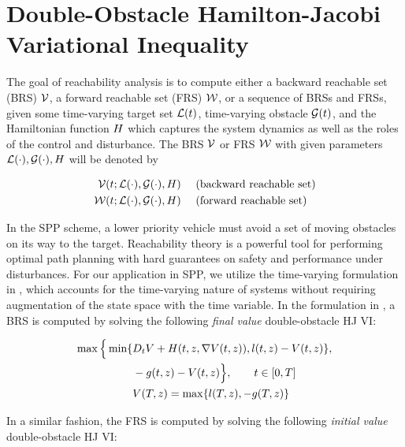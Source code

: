 \section{Double-Obstacle Hamilton-Jacobi Variational Inequality \label{sec:HJIVI}}
The goal of reachability analysis is to compute either a backward reachable set (BRS) $\mathcal{V}$, a forward reachable set (FRS) $\mathcal{W}$, or a sequence of BRSs and FRSs, given some time-varying target set $\mathcal{L}(t)$, time-varying obstacle $\mathcal{G}(t)$, and the Hamiltonian function $H$ which captures the system dynamics as well as the roles of the control and disturbance. The BRS $\mathcal{V}$ or FRS $\mathcal{W}$ with given parameters $\mathcal{L}(\cdot), \mathcal{G}(\cdot), H$ will be denoted by

\begin{equation}
\begin{aligned}
\mathcal{V}(t; \mathcal{L}(\cdot), \mathcal{G}(\cdot), H) &\quad \text{ (backward reachable set)}\\
\mathcal{W}(t; \mathcal{L}(\cdot), \mathcal{G}(\cdot), H) &\quad \text{ (forward reachable set)}
\end{aligned}
\end{equation}

In the SPP scheme, a lower priority vehicle must avoid a set of moving obstacles on its way to the target. Reachability theory is a powerful tool for performing optimal path planning with hard guarantees on safety and performance under disturbances. For our application in SPP, we utilize the time-varying formulation in \cite{}, which accounts for the time-varying nature of systems without requiring augmentation of the state space with the time variable. In the formulation in \cite{}, a BRS is computed by solving the following \textit{final value} double-obstacle HJ VI:

\begin{equation}
\label{eq:HJIVI_BRS}
\begin{aligned}
\max \Big\{ \min \{&D_t \valfunc + \ham(t, \state, \nabla \valfunc(t, \state)), \fc(t, \state) - \valfunc(t, \state) \}, \\
&-\obsfunc(t, \state) - \valfunc(t, \state) \Big\}, \qquad t \in [0, T] \\
&\valfunc(T, \state) = \max\{\fc(T, \state), -\obsfunc(T, \state)\}
\end{aligned}
\end{equation}

In a similar fashion, the FRS is computed by solving the following \textit{initial value} double-obstacle HJ VI:

